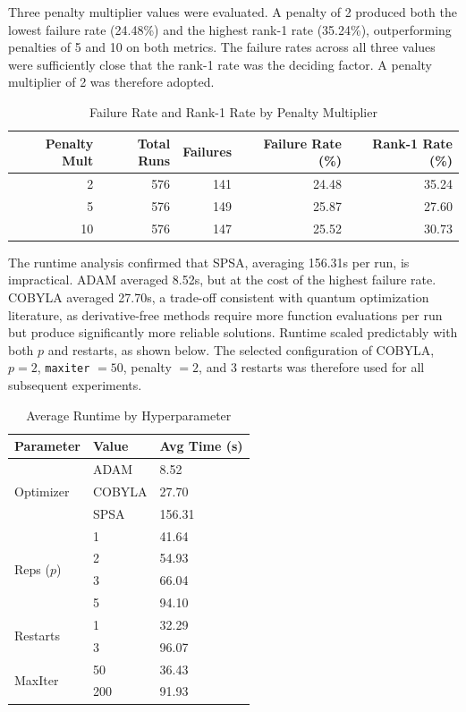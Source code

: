 \documentclass[a4paper]{report}
\begin{document}
{\begin{itemize}
\begin{itemize}
Three penalty multiplier values were evaluated. A penalty of 2 produced both the 
lowest failure rate (24.48\%) and the highest rank-1 rate (35.24\%), outperforming 
penalties of 5 and 10 on both metrics. The failure rates across all three values 
were sufficiently close that the rank-1 rate was the deciding factor. A penalty 
multiplier of 2 was therefore adopted.

\begin{table}[!ht]
\centering
\begin{tabular}{@{}rrrrr@{}}
\toprule
\textbf{Penalty Mult} & \textbf{Total Runs} & \textbf{Failures} & 
\textbf{Failure Rate (\%)} & \textbf{Rank-1 Rate (\%)} \\ \midrule
2  & 576 & 141 & 24.48 & 35.24 \\
5  & 576 & 149 & 25.87 & 27.60 \\
10 & 576 & 147 & 25.52 & 30.73 \\ \bottomrule
\end{tabular}
\caption{Failure Rate and Rank-1 Rate by Penalty Multiplier}
\label{tab:penalty-failure-rank}
\end{table}

The runtime analysis confirmed that SPSA, averaging 156.31s per run, is 
impractical. ADAM averaged 8.52s, but at the cost of the highest failure rate. 
COBYLA averaged 27.70s, a trade-off consistent with quantum optimization 
literature, as derivative-free methods require more function evaluations per run 
but produce significantly more reliable solutions. Runtime scaled predictably with 
both $p$ and restarts, as shown below. The selected configuration of COBYLA, 
$p = 2$, \texttt{maxiter} $= 50$, penalty $= 2$, and 3 restarts was therefore 
used for all subsequent experiments.

\begin{table}[!ht]
\centering
\begin{tabular}{@{}lll@{}}
\toprule
\textbf{Parameter} & \textbf{Value} & \textbf{Avg Time (s)} \\ \midrule
\multirow{3}{*}{Optimizer} & ADAM   & 8.52   \\
                           & COBYLA & 27.70  \\
                           & SPSA   & 156.31 \\ \midrule
\multirow{4}{*}{Reps ($p$)} & 1 & 41.64 \\
                             & 2 & 54.93 \\
                             & 3 & 66.04 \\
                             & 5 & 94.10 \\ \midrule
\multirow{2}{*}{Restarts}  & 1 & 32.29 \\
                           & 3 & 96.07 \\ \midrule
\multirow{2}{*}{MaxIter}   & 50  & 36.43 \\
                           & 200 & 91.93 \\ \bottomrule
\end{tabular}
\caption{Average Runtime by Hyperparameter}
\label{tab:avg-runtime}


\end{table}
\end{itemize}
\end{itemize}}
\end{document}
